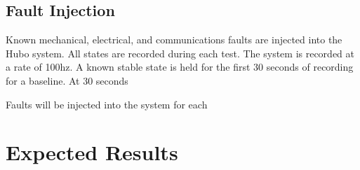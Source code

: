 \subsection{Fault Injection}\label{sec:faultInjection}
Known mechanical, electrical, and communications faults are injected into the Hubo system.  
All states are recorded during each test.  The system is recorded at a rate of 100hz.  A known
stable state is held for the first 30 seconds of recording for a baseline.  At 30 seconds


Faults will be injected into the system for each 


\section{Expected Results}\label{sec:expResults}
